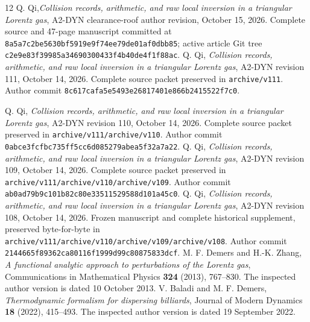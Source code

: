 \documentclass[11pt,reqno]{amsart}
\numberwithin{equation}{section}
\theoremstyle{definition}\newtheorem{definition}[theorem]{Definition}
\theoremstyle{remark}\newtheorem{remark}[theorem]{Remark}
\begin{document}
\begin{thebibliography}{12}
 Q. Qi,\emph{Collision records, arithmetic, and raw local inversion in a
triangular Lorentz gas}, A2-DYN clearance-roof author revision,
October 15, 2026. Complete source and 47-page manuscript
committed at \texttt{8a5a7c2be5630bf5919e9f74ee79de01af0dbb85};
active article Git tree \texttt{c2e9e83f39985a34690300433f4b40de4f1f88ac}.
 Q. Qi,
\emph{Collision records, arithmetic, and raw local inversion in a
triangular Lorentz gas}, A2-DYN revision 111, October 14, 2026.
Complete source packet preserved in \texttt{archive/v111}.
Author commit \texttt{8c617cafa5e5493e26817401e866b2415522f7c0}.

 Q. Qi,
\emph{Collision records, arithmetic, and raw local inversion in a
triangular Lorentz gas}, A2-DYN revision 110, October 14, 2026.
Complete source packet preserved in \texttt{archive/v111/archive/v110}.
Author commit \texttt{0abce3fcfbc735ff5cc6d085279abea5f32a7a22}.
 Q. Qi,
\emph{Collision records, arithmetic, and raw local inversion in a
triangular Lorentz gas}, A2-DYN revision 109, October 14, 2026.
Complete source packet preserved in \texttt{archive/v111/archive/v110/archive/v109}.
Author commit \texttt{ab0ad79b9c101b82c80e33511529588d101a45c0}.
 Q. Qi,
\emph{Collision records, arithmetic, and raw local inversion in a
triangular Lorentz gas}, A2-DYN revision 108, October 14, 2026.
Frozen manuscript and complete historical supplement, preserved
byte-for-byte in \texttt{archive/v111/archive/v110/archive/v109/archive/v108}. Author commit
\texttt{2144665f89362ca80116f1999d99c80875833dcf}.
 M. F. Demers and H.-K. Zhang,
\emph{A functional analytic approach to perturbations of the Lorentz gas},
Communications in Mathematical Physics \textbf{324} (2013), 767--830.
The inspected author version is dated 10 October 2013.
 V. Baladi and M. F. Demers,
\emph{Thermodynamic formalism for dispersing billiards},
Journal of Modern Dynamics \textbf{18} (2022), 415--493.
The inspected author version is dated 19 September 2022.
\end{thebibliography}
\end{document}
